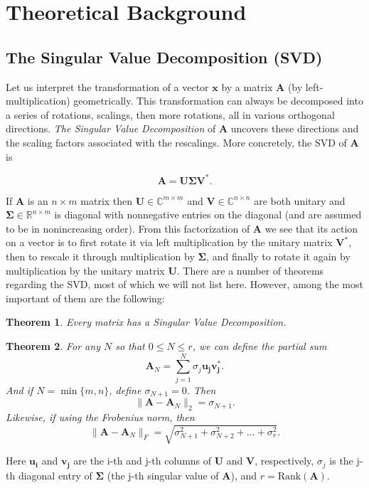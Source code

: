 \documentclass[fleqn,10pt]{../SelfArx} %
\newcommand{\mbf}[1]{\mathbf{#1}}
\newtheorem{theorem}{Theorem}
\begin{document}


\section{Theoretical Background} %
\label{sec:theoretical_background}

\subsection{The Singular Value Decomposition (SVD)}
Let us interpret the transformation of a vector $\mathbf{x}$ by a matrix $\mathbf{A}$ (by left-multiplication) geometrically. This transformation can always be decomposed into a series of rotations, scalings, then more rotations, all in various orthogonal directions. \textit{The Singular Value Decomposition} of $\mathbf{A}$ uncovers these directions and the scaling factors associated with the rescalings. More concretely, the SVD of $\mathbf{A}$ is 

\begin{equation}\label{eq:svd}
\mathbf{A}= \mathbf{U}\boldsymbol{\Sigma} \mathbf{V}^*.
\end{equation}

If $\mathbf{A}$ is an $n\times m$ matrix then $\mathbf{U} \in \mathds{C}^{m\times m}$ and $\mathbf{V}\in\mathds{C}^{n\times n}$ are both unitary and $\boldsymbol{\Sigma}\in\mathds{R}^{n\times m}$ is diagonal with nonnegative entries on the diagonal (and are assumed to be in nonincreasing order). From this factorization of $\mbf{A}$ we see that its action on a vector is to first rotate it via left multiplication by the unitary matrix $\mbf{V}^*$, then to rescale it through multiplication by $\boldsymbol{\Sigma}$, and finally to rotate it again by multiplication by the unitary matrix $\mbf{U}$. There are a number of theorems regarding the SVD, most of which we will not list here. However, among the most important of them are the following:
\begin{theorem}
	Every matrix has a Singular Value Decomposition.
\end{theorem}
\begin{theorem}
	For any $N$ so that $0\leq N\leq r$, we can define the partial sum
	\begin{equation}
		\mbf{A}_N = \sum^N_{j=1}\sigma_j \mbf{u_jv_j^*}.
	\end{equation}
	And if $N=\min\{m,n\}$, define $\sigma_{N+1}=0$. Then
	\begin{equation}
		\|\mbf{A}-\mbf{A}_N\|_2 = \sigma_{N+1}.
	\end{equation}
	Likewise, if using the Frobenius norm, then 
	\begin{equation}
		\|\mbf{A}-\mbf{A}_N\|_F = \sqrt{\sigma^2_{N+1}+\sigma^2_{N+2}+ \dots +\sigma^2_r}.
	\end{equation}
\end{theorem}
Here $\mbf{u_i}$ and $\mbf{v_j}$ are the i-th and j-th columns of $\mbf{U}$ and $\mbf{V}$, respectively, $\sigma_j$ is the j-th diagonal entry of $\boldsymbol{\Sigma}$ (the j-th singular value of $\mbf{A}$), and $r=\mathrm{Rank}(\mbf{A})$.
\end{document}
